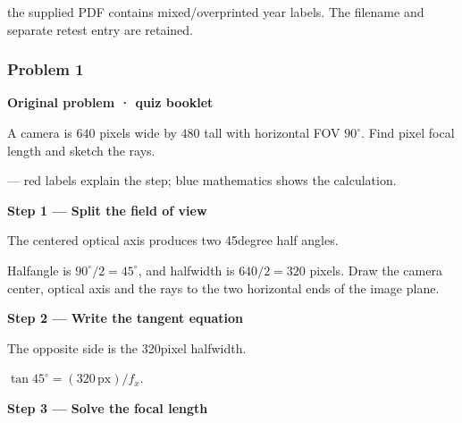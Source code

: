 \documentclass[letterpaper,11pt,english,openany,oneside]{jupyterBook}
\begin{document}
\sphinxAtStartPar
{} the supplied PDF contains mixed/overprinted year labels. The filename and separate retest entry are retained.


\subsubsection{Problem 1}
\label{\detokenize{lectures/lecture03/quiz-workbook:quiz-11-q1}}\label{\detokenize{lectures/lecture03/quiz-workbook:id1}}
\par\medskip\textbf{Original problem · quiz booklet}\par\smallskip

\sphinxAtStartPar
A camera is \(640\) pixels wide by \(480\) tall with horizontal FOV \(90^\circ\). Find pixel focal length and sketch the rays.

\par\medskip

\sphinxAtStartPar
{} — red labels explain the step; blue mathematics shows the calculation.

\par\medskip{}
{\color{QuizStepRed}\bfseries Step 1 — Split the field of view}\par\smallskip

\sphinxAtStartPar
{} The centered optical axis produces two 45\sphinxhyphen{}degree half angles.

\sphinxAtStartPar
Half\sphinxhyphen{}angle is {\color{QuizMathBlue} \(90^\circ/2=45^\circ\)}, and half\sphinxhyphen{}width is {\color{QuizMathBlue} \(640/2=320\)} pixels. Draw the camera center, optical axis and the rays to the two horizontal ends of the image plane.

\par

\par\medskip{}
{\color{QuizStepRed}\bfseries Step 2 — Write the tangent equation}\par\smallskip

\sphinxAtStartPar
{} The opposite side is the 320\sphinxhyphen{}pixel half\sphinxhyphen{}width.

\sphinxAtStartPar
{\color{QuizMathBlue} \(\tan45^\circ=(320\,\mathrm{px})/f_x\)}.

\par

\par\medskip{}
{\color{QuizStepRed}\bfseries Step 3 — Solve the focal length}\par\smallskip
\end{document}
